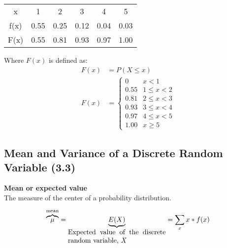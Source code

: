 \documentclass[../INDE315.tex]{subfiles}
\begin{document}
\begin{center}
    \begin{tabular}{c c c c c c}
        x & 1 & 2 & 3 & 4 & 5 \\
        f(x) & 0.55 & 0.25 & 0.12 & 0.04 & 0.03 \\
        F(x) & 0.55 & 0.81 & 0.93 & 0.97 & 1.00 \\
    \end{tabular}        
\end{center}
Where $F(x)$ is defined as:
\begin{equation*}
    \begin{aligned}
        F(x) &= P(X \leq x) \\
        F(x) &= 
            \begin{cases}
                0 & x < 1 \\
                0.55 & 1 \leq x < 2 \\
                0.81 & 2 \leq x < 3 \\
                0.93 & 3 \leq x < 4 \\
                0.97 & 4 \leq x < 5 \\
                1.00 & x \geq 5
            \end{cases}
    \end{aligned}
\end{equation*}

\subsection*{Mean and Variance of a Discrete Random Variable (3.3)}

\begin{defn}
    \textbf{Mean or expected value} \\
    The measure of the center of a probability distribution.
\end{defn}

\begin{equation*}
    \begin{aligned}
        \overbrace{\mu}^{\text{mean}} = \underbrace{E(X)}_{\parbox{5cm}{Expected value of the discrete random variable, \emph{X}}} = \sum_{x} x * f(x)       
    \end{aligned}
\end{equation*}
\end{document}
